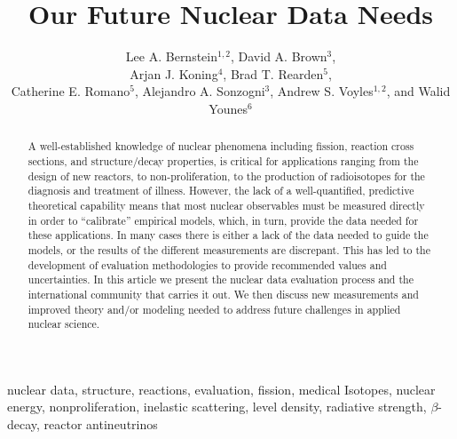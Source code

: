 \documentclass[letterpaper]{ar-1col}
\newcommand{\textred}[1]{\textcolor{red}{ #1}}
\begin{document}

\title{Our Future Nuclear Data Needs}


\author{Lee A. Bernstein$^{1,2}$, David A. Brown$^3$, \\Arjan J. Koning$^4$, Brad T. Rearden$^5$,  \\Catherine E. Romano$^5$, Alejandro A. Sonzogni$^3$, Andrew S. Voyles$^{1,2}$, and Walid  Younes$^6$
}

\begin{abstract}
A well-established knowledge of nuclear phenomena including fission, reaction cross sections, and structure/decay properties, is critical for applications ranging from the design of new reactors, to non-proliferation, to the production of radioisotopes for the diagnosis and treatment of illness.
However, the lack of a well-quantified, predictive theoretical capability means that most nuclear observables must be measured directly in order to \enquote{calibrate} empirical models, which, in turn, provide the data needed for these applications.
 In many cases there is either a lack of the data needed to guide the models, or the results of the different measurements are discrepant.
 This has led to the development of evaluation methodologies to provide recommended values and uncertainties.
 In this article we present the nuclear data evaluation process and the international community that carries it out.
 We then discuss new measurements and improved theory and/or modeling needed to address future challenges in applied nuclear science. 
\end{abstract}

\begin{keywords}
nuclear data,  structure,  reactions, evaluation, fission, medical Isotopes, nuclear energy, nonproliferation, inelastic scattering, level density, radiative strength, $\beta$-decay, reactor antineutrinos
\end{keywords}
\maketitle
\end{document}
